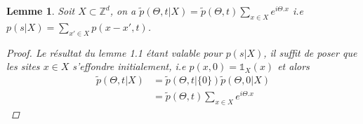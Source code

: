 \documentclass{article}
\newtheorem{lemma}[theorem]{Lemme}
\theoremstyle{definition}
\begin{document}
\begin{lemma}
	Soit $X\subset \mathbb{Z}^d$, on a $\tilde{p}(\Theta, t|X) = \tilde{p}(\Theta, t)\sum_{x\in X}e^{i\Theta.x}$ i.e $p(s|X)=\sum_{x'\in X}p(x-x',t)$.
	\begin{proof}
		Le résultat du lemme 1.1 étant valable pour $p(s|X)$, il suffit de poser que les sites $x\in X$ s'effondre initialement, i.e $p(x,0) = \mathds{1}_X(x)$ et alors \begin{align*}
			\tilde{p}(\Theta, t|X)&=\tilde{p}(\Theta,t|\{0\})\tilde{p}(\Theta,0|X)\\
					      &=\tilde{p}(\Theta, t)\sum_{x\in X}e^{i\Theta.x}
		\end{align*}
	\end{proof}
\end{lemma}
\end{document}
